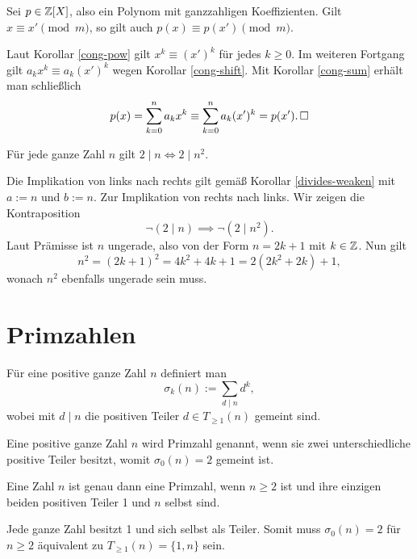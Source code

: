 \begin{Korollar}
Sei $p\in\mathbb Z[X]$, also ein Polynom mit ganzzahligen Koeffizienten.
Gilt $x\equiv x'\pmod m$, so gilt auch $p(x)\equiv p(x')\pmod m$.
\end{Korollar}
\begin{Beweis}
Laut Korollar \ref{cong-pow} gilt $x^k\equiv (x')^k$ für jedes
$k\ge 0$. Im weiteren Fortgang gilt $a_k x^k\equiv a_k (x')^k$
wegen Korollar \ref{cong-shift}. Mit Korollar \ref{cong-sum} erhält man
schließlich
\[p(x) = \sum_{k=0}^n a_k x^k\equiv\sum_{k=0}^n a_k (x')^k = p(x').\,\square\]
\end{Beweis}

\begin{Satz}
Für jede ganze Zahl $n$ gilt $2\mid n \iff 2\mid n^2$.
\end{Satz}
\begin{Beweis}
Die Implikation von links nach rechts gilt gemäß
Korollar \ref{divides-weaken} mit $a:=n$ und $b:=n$.
Zur Implikation von rechts nach links. Wir zeigen die Kontraposition
\[\neg(2\mid n) \implies \neg(2\mid n^2).\]
Laut Prämisse ist $n$ ungerade, also von der Form $n=2k+1$ mit $k\in\mathbb Z$.
Nun gilt
\[n^2 = (2k+1)^2 = 4k^2 + 4k + 1 = 2(2k^2 + 2k) + 1,\]
wonach $n^2$ ebenfalls ungerade sein muss.\,\qedsymbol
\end{Beweis}

\section{Primzahlen}

\begin{Definition}[Teilerfunktion]\newlinefirst
Für eine positive ganze Zahl $n$ definiert man
\[\sigma_k(n) := \sum_{d\mid n} d^k,\]
wobei mit $d\mid n$ die positiven Teiler $d\in T_{\ge 1}(n)$ gemeint
sind.
\end{Definition}

\begin{Definition}[Primzahl]\newlinefirst
Eine positive ganze Zahl $n$ wird Primzahl genannt, wenn sie
zwei unterschiedliche positive Teiler besitzt, womit $\sigma_0(n)=2$
gemeint ist.
\end{Definition}

\begin{Korollar}
Eine Zahl $n$ ist genau dann eine Primzahl, wenn $n\ge 2$ ist und
ihre einzigen beiden positiven Teiler 1 und $n$ selbst sind.
\end{Korollar}
\begin{Beweis}
Jede ganze Zahl besitzt 1 und sich selbst als Teiler. Somit muss
$\sigma_0(n)=2$ für $n\ge 2$ äquivalent zu $T_{\ge 1}(n)=\{1,n\}$
sein.\,\qedsymbol
\end{Beweis}

